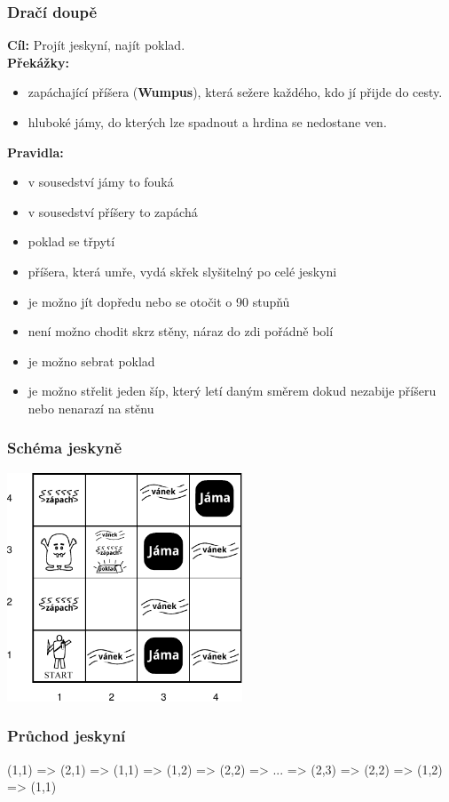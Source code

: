 \documentclass[red,professionalfont]{beamer}
\theoremstyle{definition}
\newcommand{\0}{\mbox{${\bf 0}$}}
\renewcommand{\emph}[1]{{\bf #1}}
\begin{document}
\begin{frame}\frametitle{Dračí doupě}
\emph{Cíl:} Projít jeskyní, najít poklad.\pause\\
\emph{Překážky:}\pause
\begin{itemize}
 \item zapáchající příšera (\emph{Wumpus}), která sežere každého, kdo jí přijde do cesty.\pause
 \item hluboké jámy, do kterých lze spadnout a hrdina se nedostane ven.
\end{itemize}\pause
\emph{Pravidla:}
\begin{itemize}
 \item v sousedství jámy to fouká\pause
 \item v sousedství příšery to zapáchá\pause
 \item poklad se třpytí
 \item příšera, která umře, vydá skřek slyšitelný po celé jeskyni\pause
 \item je možno jít dopředu nebo se otočit o 90 stupňů\pause
 \item není možno chodit skrz stěny, náraz do zdi pořádně bolí\pause
 \item je možno sebrat poklad\pause
 \item je možno střelit jeden šíp, který letí daným směrem dokud nezabije příšeru nebo nenarazí na stěnu\pause
\end{itemize}
\end{frame}

\begin{frame}\frametitle{Schéma jeskyně}
\begin{center}
\includegraphics[width=7cm]{wumpus.pdf}
\end{center}
\end{frame}


\begin{frame}\frametitle{Průchod jeskyní}
(1,1) => (2,1) => (1,1) => (1,2) => (2,2) => ... => (2,3) => (2,2) => (1,2) => (1,1)
\end{frame}
\end{document}
